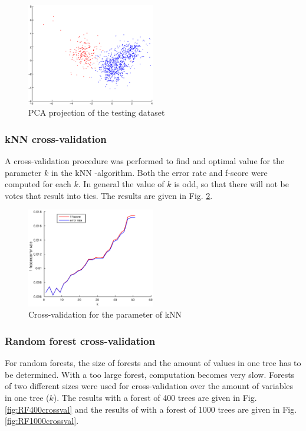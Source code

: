 \documentclass[twoside]{article}
\begin{document}
\begin{multicols}{2}
\begin{figure}[H]
\centering
\includegraphics[width=0.5\textwidth]{testpca}
\caption{PCA projection of the testing dataset}
\label{fig:color_testing_pca}
\end{figure}

\subsubsection{kNN cross-validation}

A cross-validation procedure was performed to find and optimal value for the parameter $k$ in the 
kNN -algorithm. Both the error rate and f-score were computed for each $k$. In general the value
of $k$ is odd, so that there will not be votes that result into ties. The results are given in
Fig. \ref{fig:knncrossval}.

\begin{figure}[H]
\centering
\includegraphics[width=0.5\textwidth]{knncrossval}
\caption{Cross-validation for the parameter of kNN}
\label{fig:knncrossval}
\end{figure}

\subsubsection{Random forest cross-validation}

For random forests, the size of forests and the amount of values in one tree has to be determined.
With a too large forest, computation becomes very slow. Forests of two different sizes were used
for cross-validation over the amount of variables in one tree ($k$). The results with a forest of 400
trees are given in Fig. \ref{fig:RF400crossval} and the results of with a forest of 1000 trees
are given in Fig. \ref{fig:RF1000crossval}.


\end{multicols}
\end{document}
